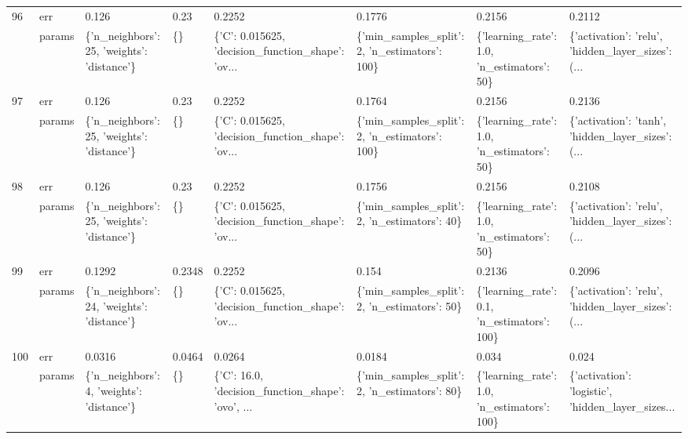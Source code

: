 \begin{tabular}{llllllll}
96  & err &                                       0.126 &    0.23 &                                             0.2252 &                                         0.1776 &                                       0.2156 &                                             0.2112 \\
    & params &  \{'n\_neighbors': 25, 'weights': 'distance'\} &      \{\} &  \{'C': 0.015625, 'decision\_function\_shape': 'ov... &  \{'min\_samples\_split': 2, 'n\_estimators': 100\} &   \{'learning\_rate': 1.0, 'n\_estimators': 50\} &  \{'activation': 'relu', 'hidden\_layer\_sizes': (... \\
97  & err &                                       0.126 &    0.23 &                                             0.2252 &                                         0.1764 &                                       0.2156 &                                             0.2136 \\
    & params &  \{'n\_neighbors': 25, 'weights': 'distance'\} &      \{\} &  \{'C': 0.015625, 'decision\_function\_shape': 'ov... &  \{'min\_samples\_split': 2, 'n\_estimators': 100\} &   \{'learning\_rate': 1.0, 'n\_estimators': 50\} &  \{'activation': 'tanh', 'hidden\_layer\_sizes': (... \\
98  & err &                                       0.126 &    0.23 &                                             0.2252 &                                         0.1756 &                                       0.2156 &                                             0.2108 \\
    & params &  \{'n\_neighbors': 25, 'weights': 'distance'\} &      \{\} &  \{'C': 0.015625, 'decision\_function\_shape': 'ov... &   \{'min\_samples\_split': 2, 'n\_estimators': 40\} &   \{'learning\_rate': 1.0, 'n\_estimators': 50\} &  \{'activation': 'relu', 'hidden\_layer\_sizes': (... \\
99  & err &                                      0.1292 &  0.2348 &                                             0.2252 &                                          0.154 &                                       0.2136 &                                             0.2096 \\
    & params &  \{'n\_neighbors': 24, 'weights': 'distance'\} &      \{\} &  \{'C': 0.015625, 'decision\_function\_shape': 'ov... &   \{'min\_samples\_split': 2, 'n\_estimators': 50\} &  \{'learning\_rate': 0.1, 'n\_estimators': 100\} &  \{'activation': 'relu', 'hidden\_layer\_sizes': (... \\
100 & err &                                      0.0316 &  0.0464 &                                             0.0264 &                                         0.0184 &                                        0.034 &                                              0.024 \\
    & params &   \{'n\_neighbors': 4, 'weights': 'distance'\} &      \{\} &  \{'C': 16.0, 'decision\_function\_shape': 'ovo', ... &   \{'min\_samples\_split': 2, 'n\_estimators': 80\} &  \{'learning\_rate': 1.0, 'n\_estimators': 100\} &  \{'activation': 'logistic', 'hidden\_layer\_sizes... \\
\bottomrule
\end{tabular}
